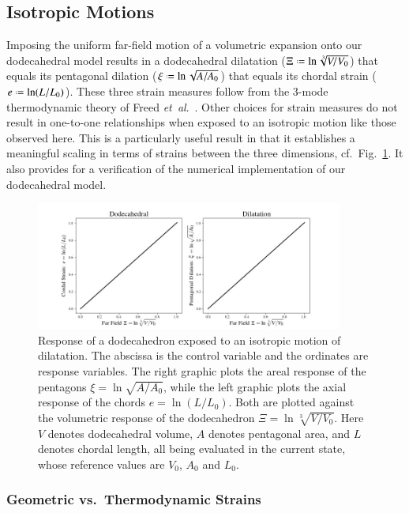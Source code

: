 \subsection{Isotropic Motions}

Imposing the uniform far-field motion of a volumetric expansion onto our dodecahedral model results in a dodecahedral dilatation ($\Xi \defeq \ln \sqrt[3]{ V \! / V_0 }$) that equals its pentagonal dilation ($\xi \defeq \ln \sqrt{ A / A_0 }$) that equals its chordal strain ($e \defeq \ln ( L / L_0 )$).  These three strain measures follow from the 3-mode thermo\-dynamic theory of Freed \textit{et~al}.\ \cite{Freedetal17,FreedZamani19}.  Other choices for strain measures do not result in one-to-one relationships when exposed to an isotropic motion like those observed here.  This is a particularly useful result in that it establishes a meaningful scaling in terms of strains between the three dimensions, cf.\ Fig.~\ref{figDilatation}.  It also provides for a verification of the numerical implementation of our dodecahedral model.  

\begin{figure}
	\centering
	\includegraphics[width=0.9\textwidth]{figures/dilatation.jpg}
	\caption{Response of a dodecahedron exposed to an isotropic motion of dilatation.  The abscissa is the control variable and the ordinates are response variables. The right graphic plots the areal response of the pentagons $\xi = \ln \sqrt{A / A_0}$, while the left graphic plots the axial response of the chords $e = \ln ( L / L_0)$. Both are plotted against the volumetric response of the dodecahedron $\Xi = \ln \sqrt[3]{V \! / V_0}$.  Here $V$ denotes dodecahedral volume, $A$ denotes pentagonal area, and $L$ denotes chordal length, all being evaluated in the current state, whose reference values are $V_0$, $A_0$ and $L_0$.}
	\label{figDilatation}
\end{figure}

\subsubsection{Geometric vs.\ Thermodynamic Strains}

